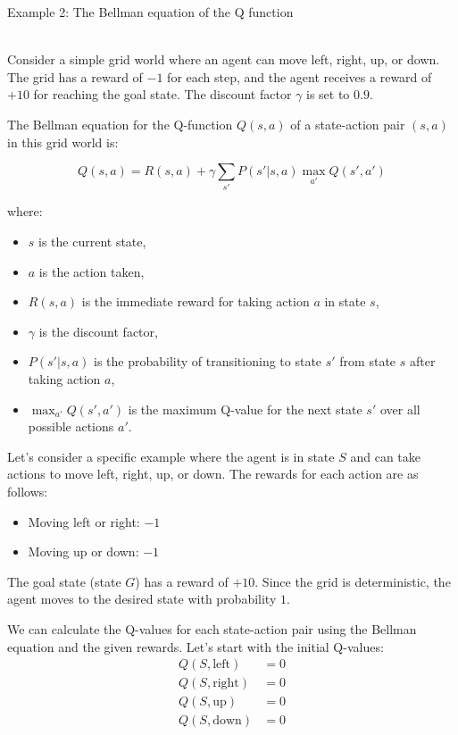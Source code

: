 \documentclass{article}
\begin{document}
 
\begin{Large}
Example 2: The Bellman equation of the Q function
\end{Large}
\\
Consider a simple grid world where an agent can move left, right, up, or down. The grid has a reward of $-1$ for each step, and the agent receives a reward of $+10$ for reaching the goal state. The discount factor $\gamma$ is set to $0.9$.

The Bellman equation for the Q-function $Q(s, a)$ of a state-action pair $(s, a)$ in this grid world is:

\[
Q(s, a) = R(s, a) + \gamma \sum_{s'} P(s' | s, a) \max_{a'} Q(s', a')
\]

where:
\begin{itemize}
    \item $s$ is the current state,
    \item $a$ is the action taken,
    \item $R(s, a)$ is the immediate reward for taking action $a$ in state $s$,
    \item $\gamma$ is the discount factor,
    \item $P(s' | s, a)$ is the probability of transitioning to state $s'$ from state $s$ after taking action $a$,
    \item $\max_{a'} Q(s', a')$ is the maximum Q-value for the next state $s'$ over all possible actions $a'$.
\end{itemize}

Let's consider a specific example where the agent is in state $S$ and can take actions to move left, right, up, or down. The rewards for each action are as follows:
\begin{itemize}
    \item Moving left or right: $-1$
    \item Moving up or down: $-1$
\end{itemize}

The goal state (state $G$) has a reward of $+10$. Since the grid is deterministic, the agent moves to the desired state with probability $1$.

We can calculate the Q-values for each state-action pair using the Bellman equation and the given rewards. Let's start with the initial Q-values:
\[
\begin{aligned}
Q(S, \text{left}) &= 0 \\
Q(S, \text{right}) &= 0 \\
Q(S, \text{up}) &= 0 \\
Q(S, \text{down}) &= 0 \\
\end{aligned}
\]
\end{document}
